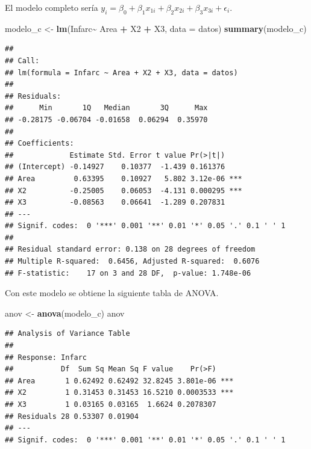 \documentclass[
]{book}
\newenvironment{Shaded}{\begin{snugshade}}{\end{snugshade}}
\newcommand{\AttributeTok}[1]{\textcolor[rgb]{0.13,0.29,0.53}{#1}}
\newcommand{\FunctionTok}[1]{\textcolor[rgb]{0.13,0.29,0.53}{\textbf{#1}}}
\newcommand{\NormalTok}[1]{#1}
\newcommand{\OtherTok}[1]{\textcolor[rgb]{0.56,0.35,0.01}{#1}}
\newcommand{\SpecialCharTok}[1]{\textcolor[rgb]{0.81,0.36,0.00}{\textbf{#1}}}
\begin{document}
El modelo completo sería \(y_i = \beta_0 + \beta_1x_{1i} +\beta_2x_{2i} + \beta_3x_{3i}+\epsilon_i\).

\begin{Shaded}
\begin{Highlighting}[]
\NormalTok{modelo\_c }\OtherTok{\textless{}{-}} \FunctionTok{lm}\NormalTok{(Infarc}\SpecialCharTok{\textasciitilde{}}\NormalTok{ Area }\SpecialCharTok{+}\NormalTok{ X2 }\SpecialCharTok{+}\NormalTok{ X3, }\AttributeTok{data =}\NormalTok{ datos)}
\FunctionTok{summary}\NormalTok{(modelo\_c)}
\end{Highlighting}
\end{Shaded}

\begin{verbatim}
## 
## Call:
## lm(formula = Infarc ~ Area + X2 + X3, data = datos)
## 
## Residuals:
##      Min       1Q   Median       3Q      Max 
## -0.28175 -0.06704 -0.01658  0.06294  0.35970 
## 
## Coefficients:
##             Estimate Std. Error t value Pr(>|t|)    
## (Intercept) -0.14927    0.10377  -1.439 0.161376    
## Area         0.63395    0.10927   5.802 3.12e-06 ***
## X2          -0.25005    0.06053  -4.131 0.000295 ***
## X3          -0.08563    0.06641  -1.289 0.207831    
## ---
## Signif. codes:  0 '***' 0.001 '**' 0.01 '*' 0.05 '.' 0.1 ' ' 1
## 
## Residual standard error: 0.138 on 28 degrees of freedom
## Multiple R-squared:  0.6456, Adjusted R-squared:  0.6076 
## F-statistic:    17 on 3 and 28 DF,  p-value: 1.748e-06
\end{verbatim}

Con este modelo se obtiene la siguiente tabla de ANOVA.

\begin{Shaded}
\begin{Highlighting}[]
\NormalTok{anov }\OtherTok{\textless{}{-}} \FunctionTok{anova}\NormalTok{(modelo\_c)}
\NormalTok{anov}
\end{Highlighting}
\end{Shaded}

\begin{verbatim}
## Analysis of Variance Table
## 
## Response: Infarc
##           Df  Sum Sq Mean Sq F value    Pr(>F)    
## Area       1 0.62492 0.62492 32.8245 3.801e-06 ***
## X2         1 0.31453 0.31453 16.5210 0.0003533 ***
## X3         1 0.03165 0.03165  1.6624 0.2078307    
## Residuals 28 0.53307 0.01904                      
## ---
## Signif. codes:  0 '***' 0.001 '**' 0.01 '*' 0.05 '.' 0.1 ' ' 1
\end{verbatim}
\end{document}
